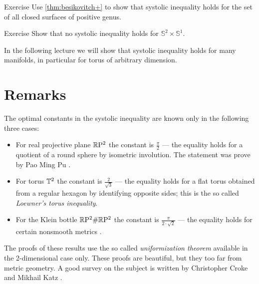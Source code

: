\begin{thm}{Exercise}\label{ex:sysSg}
Use \ref{thm:besikovitch+} to show that systolic inequality holds for the set of all closed surfaces of positive genus.
\end{thm}

\begin{thm}{Exercise}\label{ex:sysS2xS1}
Show that no systolic inequality holds for $\mathbb{S}^2\times\mathbb{S}^1$.
\end{thm}

In the following lecture we will show that systolic inequality holds for many manifolds, in particular for torus of arbitrary dimension.


\section{Remarks}


The optimal constants in the systolic inequality are known only in the following three cases:
\begin{itemize}
\item For real projective plane $\mathbb{R}\mathrm{P}^2$ the constant is $\tfrac\pi2$ --- the equality holds for a quotient of a round sphere by isometric involution. The statement was prove by Pao Ming Pu \cite{pu}.\label{page:pu}
\item For torus $\mathbb{T}^2$ the constant is $\tfrac2{\sqrt{3}}$ --- the equality holds for a flat torus obtained from a regular hexagon by identifying opposite sides; this is the so called \emph{Loewner's torus inequality}.
\item For the Klein bottle $\mathbb{R}\mathrm{P}^2\#\mathbb{R}\mathrm{P}^2$  the constant is $\tfrac\pi{2\cdot\sqrt2}$ --- the equality holds for certain nonsmooth metrics \cite{bavard}.
\end{itemize}
The proofs of these results use the so called {}\emph{uniformization theorem}   available in the 2-dimensional case only.
These proofs are beautiful, but they too far from metric geometry.
A good survey on the subject is written by Christopher Croke and Mikhail Katz \cite{croke-katz}.



